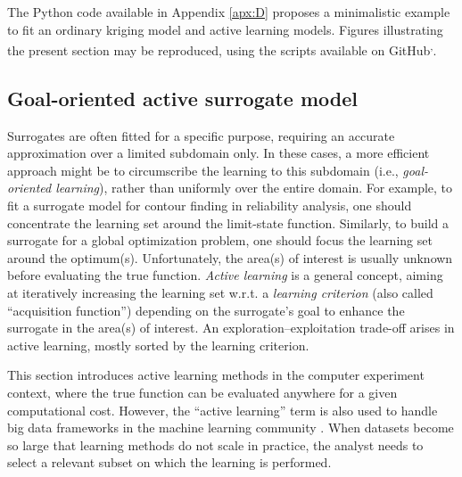 \begin{otexample}
    The Python code available in Appendix \ref{apx:D} proposes a minimalistic \ot example to fit an ordinary kriging model and active learning models. 
    Figures illustrating the present section may be reproduced, using the \ot scripts available on GitHub\footnotemark[13]\textsuperscript{,}\footnotemark[14].  
\end{otexample}



\subsection{Goal-oriented active surrogate model}

Surrogates are often fitted for a specific purpose, requiring an accurate approximation over a limited subdomain only. 
In these cases, a more efficient approach might be to circumscribe the learning to this subdomain (i.e., \textit{goal-oriented learning}), rather than uniformly over the entire domain. 
For example, to fit a surrogate model for contour finding in reliability analysis, one should concentrate the learning set around the limit-state function. 
Similarly, to build a surrogate for a global optimization problem, one should focus the learning set around the optimum(s). 
Unfortunately, the area(s) of interest is usually unknown before evaluating the true function. 
\textit{Active learning} is a general concept, aiming at iteratively increasing the learning set w.r.t. a \textit{learning criterion} (also called ``acquisition function'') depending on the surrogate's goal to enhance the surrogate in the area(s) of interest. 
An exploration--exploitation trade-off arises in active learning, mostly sorted by the learning criterion.

\begin{remark}
    This section introduces active learning methods in the computer experiment context, where the true function can be evaluated anywhere for a given computational cost. 
    However, the ``active learning'' term is also used to handle big data frameworks in the machine learning community \citep{qiu_2016}. 
    When datasets become so large that learning methods do not scale in practice, the analyst needs to select a relevant subset on which the learning is performed.  
\end{remark}

